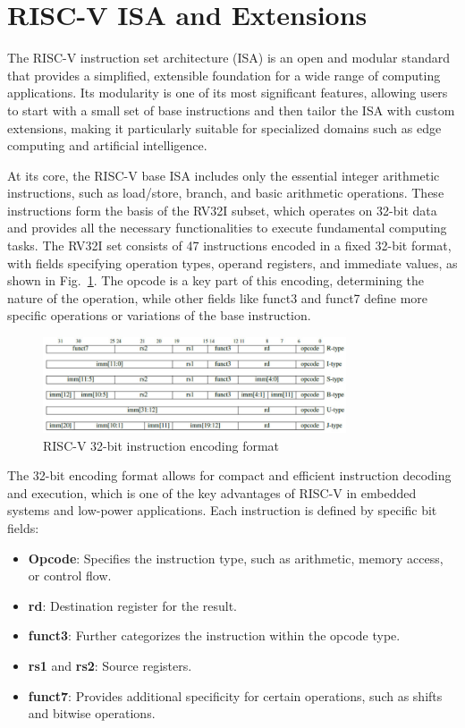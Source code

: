 \section{RISC-V ISA and Extensions}

The RISC-V instruction set architecture (ISA) is an open and modular standard that provides a simplified, extensible foundation for a wide range of computing applications. Its modularity is one of its most significant features, allowing users to start with a small set of base instructions and then tailor the ISA with custom extensions, making it particularly suitable for specialized domains such as edge computing and artificial intelligence.

At its core, the RISC-V base ISA includes only the essential integer arithmetic instructions, such as load/store, branch, and basic arithmetic operations. These instructions form the basis of the RV32I subset, which operates on 32-bit data and provides all the necessary functionalities to execute fundamental computing tasks. The RV32I set consists of 47 instructions encoded in a fixed 32-bit format, with fields specifying operation types, operand registers, and immediate values, as shown in Fig.~\ref{fig:riscvisa}. The opcode is a key part of this encoding, determining the nature of the operation, while other fields like funct3 and funct7 define more specific operations or variations of the base instruction.

\begin{figure}
    \centering
    \includegraphics[width=0.8\textwidth]{figures/riscvisa.png}
    \caption{RISC-V 32-bit instruction encoding format \cite{RISCVISA}}
    \label{fig:riscvisa}
\end{figure}

The 32-bit encoding format allows for compact and efficient instruction decoding and execution, which is one of the key advantages of RISC-V in embedded systems and low-power applications. Each instruction is defined by specific bit fields: \cite{RISCVISA}
\begin{itemize}
    \item \textbf{Opcode}: Specifies the instruction type, such as arithmetic, memory access, or control flow.
    \item \textbf{rd}: Destination register for the result.
    \item \textbf{funct3}: Further categorizes the instruction within the opcode type.
    \item \textbf{rs1} and \textbf{rs2}: Source registers.
    \item \textbf{funct7}: Provides additional specificity for certain operations, such as shifts and bitwise operations.
\end{itemize}

